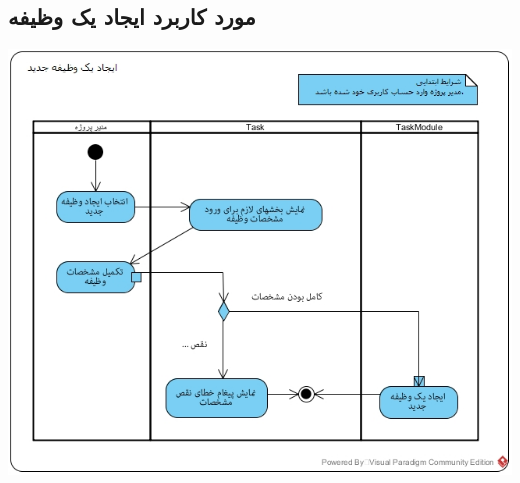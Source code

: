 \subsection*{مورد کاربرد ایجاد یک وظیفه}
\vspace{2cm}
\begin{center}
\includegraphics[width=\textwidth]{ActivityDiagramsWithSwimlanes/18.jpg}
\end{center}

\newpage
\vspace{2cm}

